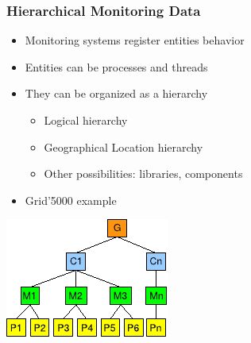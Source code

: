 \frame
{
   \frametitle{Hierarchical Monitoring Data}
   \begin{itemize}
      \item Monitoring systems register entities behavior
      \item Entities can be processes and threads
      \item They can be organized as a hierarchy
	 \begin{itemize}
	    \item Logical hierarchy
	    \item Geographical Location hierarchy
	    \item Other possibilities: libraries, components
	 \end{itemize}
      \item Grid'5000 example
   \end{itemize}

   \vfill

   \begin{minipage}{\textwidth}
   \centering
   \includegraphics[width=.5\textwidth]{img/hierarchical-mon-data-4.pdf}
   \end{minipage}
}



